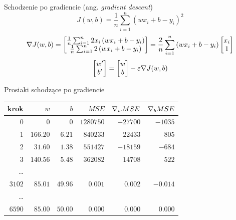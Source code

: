 \documentclass{sa}
\newcommand{\ang}[1]{(ang. \emph{#1})}
\newcommand{\grad}{\ensuremath\nabla}
\begin{document}
\begin{frame}{Schodzenie po gradiencie \ang{gradient descent}}
\[ J(w, b) = \frac{1}{n}\sum_{i=1}^n \left(wx_i+b-y_i\right)^2 \]
\[ \grad J(w,b) = \begin{bmatrix}
\frac{1}{n}\sum_{i=1}^n 2x_i\left(wx_i+b-y_i\right) \\
\frac{1}{n}\sum_{i=1}^n 2\left(wx_i+b-y_i\right)
\end{bmatrix}
=
\frac{2}{n}\sum_{i=1}^n 
\left(wx_i+b-y_i\right) \begin{bmatrix}
x_i \\
1
\end{bmatrix}
\]
\[
\begin{bmatrix}
w' \\ b'
\end{bmatrix}
=
\begin{bmatrix}
w \\ b
\end{bmatrix}
-\varepsilon \grad J(w,b)
\]
\end{frame}

\begin{frame}{Prosiaki schodzące po gradiencie}
\begin{center}
\begin{tabular}{rrrrrr}
krok & $w$ & $b$ & $MSE$ & $\grad_w MSE$ & $\grad_b MSE$ \\
\hline
0 & 0 & 0 & $1280750$ & $-27700$ & $-1035$ \\
1 & $166.20$ & $6.21$ & $840233$ & $22433$ & $805$ \\
2 & $31.60$ & $1.38$ & $551427$ & $-18159$ & $-684$ \\
3 & $140.56$ & $5.48$ & $362082$ & $14708$ & $522$ \\
\ldots \\
$3102$ & $85.01$ & $49.96$ & $0.001$ & $0.002$ & $-0.014$ \\
\ldots \\
$6590$ & $85.00$ & $50.00$ & $0.000$ & $0.000$ & $0.000$ \\
\end{tabular}
\end{center}
\end{frame}
\end{document}
